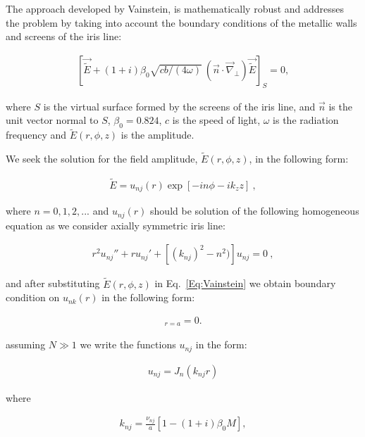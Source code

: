     The approach developed by Vainstein, is mathematically robust and addresses the problem by taking into account the boundary conditions of the metallic walls and screens of the iris line: 
    
    \begin{align}
        \left[\vec{\widetilde{E}}+ (1+i) \beta_0 \sqrt{c b/(4 \omega)} ~
        (\vec{n} \cdot \vec{\nabla}_\bot) \vec{\widetilde{E}}\right]_{S} =
        0, 
        \label{Eq:Vainstein}
    \end{align}
    
    where $S$ is the virtual surface formed by the screens of the iris line, and
    $\vec{n}$ is the unit vector normal to $S$, $\beta_0 = 0.824$, $c$ is the speed of light, $\omega$ is the radiation frequency and $\widetilde{E}(r,\phi,z)$ is the amplitude.

    We seek the solution for the field amplitude, $\widetilde{E}(r,\phi,z)$, in the following form:
    
    \begin{align}
        \widetilde{E} = u_{nj}(r)\exp[-in \phi -i k_z z]~, \label{solu}
    \end{align}

    where $n = 0,1, 2, ...$ and $u_{nj}(r)$ should be solution of the following homogeneous equation as we consider axially symmetric iris line:
    
    \begin{align}
        r^2 u_{nj}'' + r u_{nj}' + [(k_{nj})^2 - n^2)] u_{nj} = 0~,
        \label{homogeq}
    \end{align}
    
    and after substituting $\widetilde{E}(r,\phi,z)$ in Eq.~\ref{Eq:Vainstein} we obtain boundary condition on $u_{nk}(r)$ in the following form:
    
    \begin{align}
        [u_{nj} + (1+i) \beta_0 \sqrt{c b/ (4\omega)} u_{nj}']_{r = a} = 0.
        \label{boundh}
    \end{align}
    
    assuming $N \gg 1$ we write the functions $u_{nj}$ in the form:
    
    \begin{eqnarray}
        u_{nj} = J_n(k_{nj} r)
        \label{Eq:Bessel}
    \end{eqnarray}

    where
    
    \begin{eqnarray}
        k_{nj} = \frac{\nu_{nj}}{a} [1-(1+i) \beta_0 M], 
        \label{Eq:k_nj}
    \end{eqnarray}
    
